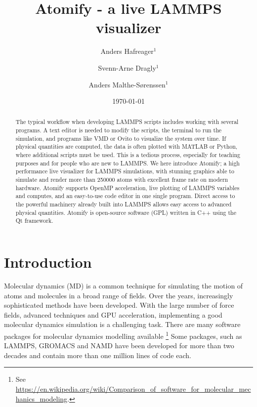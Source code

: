 \documentclass[aps,pre,twocolumn,letterpaper,floatfix]{revtex4}
\begin{document}
\title{Atomify - a live LAMMPS visualizer}
\author{Anders Hafreager$^1$}
\author{Svenn-Arne Dragly$^{1}$} 
\author{Anders Malthe-S\o renssen$^1$}
\date{\today} 


\begin{abstract}
%
The typical workflow when developing LAMMPS scripts includes working with
several programs.
A text editor is needed to modify the scripts,
the terminal to run the simulation, and programs like VMD or Ovito to visualize
the system over time.
If physical quantities are computed, the data is often plotted with MATLAB or
Python, where additional scripts must be used.
This is a tedious process, especially for teaching purposes and for people who
are new to LAMMPS.
We here introduce Atomify;
a high performance live visualizer for LAMMPS simulations,
with stunning graphics able to simulate and render more than 250000 atoms with
excellent frame rate on modern hardware.
Atomify supports OpenMP acceleration, live plotting of LAMMPS variables and
computes, and an easy-to-use code editor in one single program.
Direct access to the powerful machinery already built into LAMMPS allows easy
access to advanced physical quantities.
Atomify is open-source software (GPL) written in C++ using the Qt framework.
%
\end{abstract} 
 
\maketitle

\section{Introduction}
%
Molecular dynamics (MD) is a common technique for simulating the motion of atoms
and molecules in a broad range of fields.
Over the years, increasingly sophisticated methods have been developed.
With the large number of force fields, advanced techniques and GPU acceleration,
implementing a good molecular dynamics simulation is a challenging task.
There are many software packages for molecular dynamics modelling
available
\footnote{See \url{https://en.wikipedia.org/wiki/Comparison_of_software_for_molecular_mechanics_modeling}.}
Some packages, such as LAMMPS\cite{Plimpton1995Fast}, GROMACS\cite{Pronk2013}
and NAMD\cite{Phillips2005Scalable} have been developed for more than two decades 
and contain more than one million lines of code each.
\end{document}
